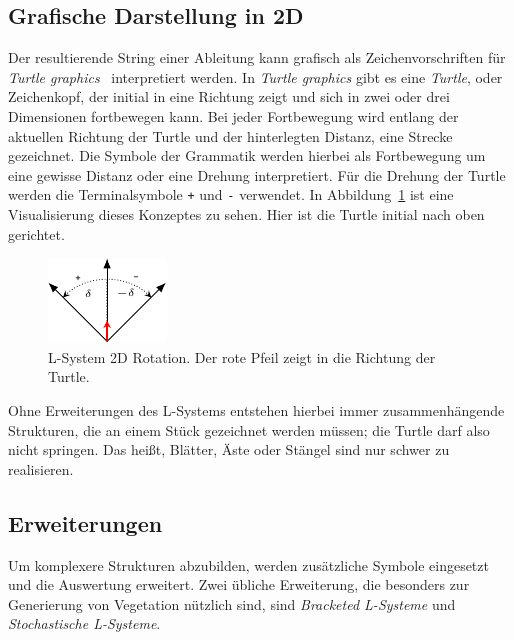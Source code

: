 \subsection{Grafische Darstellung in 2D}
Der resultierende String einer Ableitung kann grafisch als Zeichenvorschriften für \textit{Turtle graphics}~\cite{GOLDMAN20041471} interpretiert werden.
In \textit{Turtle graphics} gibt es eine \textit{Turtle}, oder Zeichenkopf, der initial in eine Richtung zeigt und sich in zwei oder drei Dimensionen fortbewegen kann.
Bei jeder Fortbewegung wird entlang der aktuellen Richtung der Turtle und der hinterlegten Distanz, eine Strecke gezeichnet.
Die Symbole der Grammatik werden hierbei als Fortbewegung um eine gewisse Distanz oder eine Drehung interpretiert.
Für die Drehung der Turtle werden die Terminalsymbole \texttt{+} und \texttt{-} verwendet.
In Abbildung~\ref{fig:L-System 2D Rotation} ist eine Visualisierung dieses Konzeptes zu sehen.
Hier ist die Turtle initial nach oben gerichtet.

\begin{figure}[ht]
    \centering
    \includegraphics[width=0.5\linewidth]{chapters/02_Grundlagen/L_System/L_System_2D.pdf}
    \caption[L-System 2D Rotation]{L-System 2D Rotation. Der rote Pfeil zeigt in die Richtung der Turtle.}\label{fig:L-System 2D Rotation}
\end{figure}
Ohne Erweiterungen des L-Systems entstehen hierbei immer zusammenhängende Strukturen, die an einem Stück gezeichnet werden müssen; die Turtle darf also nicht springen.
Das heißt, Blätter, Äste oder Stängel sind nur schwer zu realisieren.


\subsection{Erweiterungen}
Um komplexere Strukturen abzubilden, werden zusätzliche Symbole eingesetzt und die Auswertung erweitert.
Zwei übliche Erweiterung, die besonders zur Generierung von Vegetation nützlich sind, sind \textit{Bracketed L-Systeme} und \textit{Stochastische L-Systeme}.

